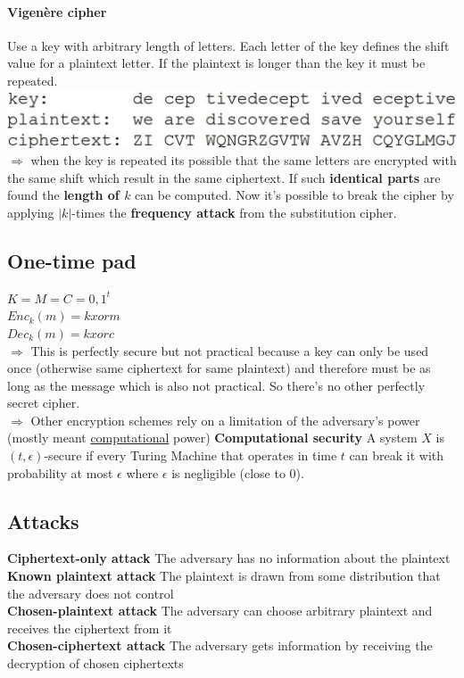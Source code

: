 \documentclass[12pt]{article}
\begin{document}
	\paragraph{Vigenère cipher} Use a key with arbitrary length of letters. Each letter of the key defines the shift value for a plaintext letter. If the plaintext is longer than the key it must be repeated.\\
	\includegraphics[width=\textwidth]{figures/vigenere-cipher.JPG}\\
	$\Rightarrow$ when the key is repeated its possible that the same letters are encrypted with the same shift which result in the same ciphertext. If such \textbf{identical parts} are found the \textbf{length of $k$} can be computed. Now it's possible to break the cipher by applying $|k|$-times the \textbf{frequency attack} from the substitution cipher.
	
	\subsection{One-time pad}
	$K = M = C = {0,1}^t$\\
	$Enc_k(m) = k xor m$\\
	$Dec_k(m) = k xor c$\\
	$\Rightarrow$ This is perfectly secure but not practical because a key can only be used once (otherwise same ciphertext for same plaintext) and therefore must be as long as the message which is also not practical. So there's no other perfectly secret cipher.\\
	$\Rightarrow$ Other encryption schemes rely on a limitation of the adversary's power (mostly meant \underline{computational} power)
	\textbf{Computational security} A system $X$ is $(t,\epsilon)$-secure if every Turing Machine that operates in time $t$ can break it with probability at most $\epsilon$ where $\epsilon$ is negligible (close to 0).
	
	\subsection{Attacks}
	\textbf{Ciphertext-only attack} The adversary has no information about the plaintext\\
	\textbf{Known plaintext attack} The plaintext is drawn from some distribution that the adversary does not control\\
	\textbf{Chosen-plaintext attack} The adversary can choose arbitrary plaintext and receives the ciphertext from it\\
	\textbf{Chosen-ciphertext attack} The adversary gets information by receiving the decryption of chosen ciphertexts
	
\end{document}
